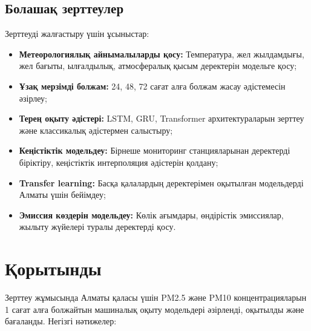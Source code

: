\documentclass[12pt,a4paper]{article}
\begin{document}
\subsection{Болашақ зерттеулер}

Зерттеуді жалғастыру үшін ұсыныстар:
\begin{itemize}
\item \textbf{Метеорологиялық айнымалыларды қосу:} Температура, жел жылдамдығы, жел бағыты, ылғалдылық, атмосфералық қысым деректерін модельге қосу;
\item \textbf{Ұзақ мерзімді болжам:} 24, 48, 72 сағат алға болжам жасау әдістемесін әзірлеу;
\item \textbf{Терең оқыту әдістері:} LSTM, GRU, Transformer архитектураларын зерттеу және классикалық әдістермен салыстыру;
\item \textbf{Кеңістіктік модельдеу:} Бірнеше мониторинг станцияларынан деректерді біріктіру, кеңістіктік интерполяция әдістерін қолдану;
\item \textbf{Transfer learning:} Басқа қалалардың деректерімен оқытылған модельдерді Алматы үшін бейімдеу;
\item \textbf{Эмиссия көздерін модельдеу:} Көлік ағымдары, өндірістік эмиссиялар, жылыту жүйелері туралы деректерді қосу.
\end{itemize}

\section{Қорытынды}

Зерттеу жұмысында Алматы қаласы үшін PM2.5 және PM10 концентрацияларын 1 сағат алға болжайтын машиналық оқыту модельдері әзірленді, оқытылды және бағаланды. Негізгі нәтижелер:
\end{document}
